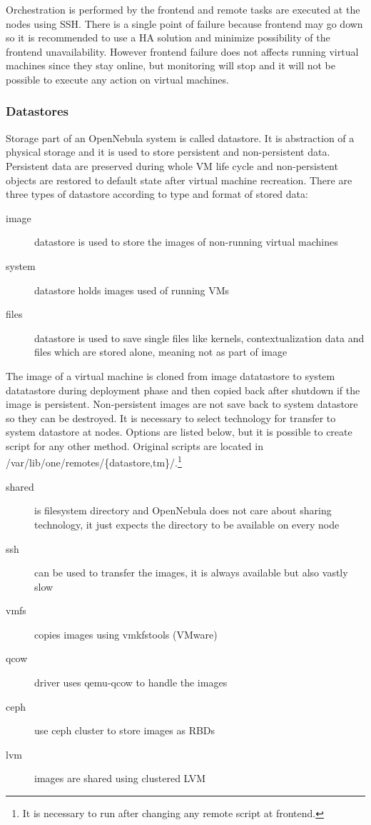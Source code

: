Orchestration is performed by the frontend and remote tasks are executed at the nodes using \Ac{SSH}. There is a single point of failure because frontend may go down so it is recommended to use a \Ac{HA} solution and minimize possibility of the frontend unavailability. However frontend failure does not affects running virtual machines since they stay online, but monitoring will stop and it will not be possible to execute any action on virtual machines.

\subsubsection{Datastores}
Storage part of an OpenNebula system is called datastore. It is abstraction of a physical storage and it is used to store persistent and non-persistent data. Persistent data are preserved during whole \Ac{VM} life cycle and non-persistent objects are restored to default state after virtual machine recreation. There are three types of datastore according to type and format of stored data:
\begin{description}
	\item[image] datastore is used to store the images of non-running virtual machines
	\item[system] datastore holds images used of running \Ac{VM}s
	\item[files] datastore is used to save single files like kernels, contextualization data and files which are stored alone, meaning not as part of image
\end{description}

The image of a virtual machine is cloned from image datatastore to system datatastore during deployment phase and then copied back after shutdown if the image is persistent. Non-persistent images are not save back to system datastore so they can be destroyed. It is necessary to select technology for transfer to system datastore at nodes. Options are listed below, but it is possible to create script for any other method. Original scripts are located in /var/lib/one/remotes/\{datastore,tm\}/.\footnote{It is necessary to run  after changing any remote script at frontend.}
\begin{description}
	\item[shared] is filesystem directory and OpenNebula does not care about sharing technology, it just expects the directory to be available on every node
	\item[ssh] can be used to transfer the images, it is always available but also vastly slow
	\item[vmfs] copies images using vmkfstools (VMware)
	\item[qcow] driver uses qemu-qcow to handle the images
	\item[ceph] use ceph cluster to store images as \Ac{RBD}s
	\item[lvm] images are shared using clustered LVM
\end{description}

